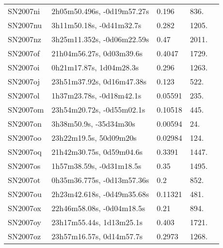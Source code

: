 \begin{longtable}{lllll}
         SN2007ni &     2h05m50.496s, -0d19m57.27s &    0.196 &           836. &    \citet{2011ApJ...740...92G} \\
         SN2007nu &       3h11m50.18s, -0d41m32.7s &    0.282 &          1205. &    \citet{2011ApJ...740...92G} \\
         SN2007nz &     3h25m11.352s, -0d06m22.59s &     0.47 &          2011. &    \citet{2007CBET.1109A...1B} \\
         SN2007of &       21h04m56.27s, 0d03m39.6s &   0.4047 &          1729. &    \citet{2011ApJ...740...92G} \\
         SN2007oi &        0h21m17.87s, 1d04m28.3s &    0.296 &          1263. &    \citet{2011ApJ...740...92G} \\
         SN2007oj &      23h51m37.92s, 0d16m47.38s &    0.123 &           522. &    \citet{2011ApJ...740...92G} \\
         SN2007ol &       1h37m23.78s, -0d18m42.1s &  0.05591 &           235. &    \citet{2001SDSSe.1...0000:} \\
         SN2007om &      23h54m20.72s, -0d55m02.1s &  0.10518 &           445. &    \citet{2003SDSS1.C...0000:} \\
         SN2007on &         3h38m50.9s, -35d34m30s &  0.00594 &            24. &    \citet{2016MNRAS.459.4450W} \\
         SN2007oo &         23h22m19.5s, 50d09m20s &  0.02984 &           124. &    \citet{1999ApJS..121..287H} \\
         SN2007oq &       21h42m30.75s, 0d59m04.6s &   0.3391 &          1447. &    \citet{2011ApJ...740...92G} \\
         SN2007os &       1h57m38.59s, -0d31m18.5s &     0.35 &          1495. &    \citet{2007CBET.1128A...1B} \\
         SN2007ot &     0h35m36.775s, -0d13m57.36s &      0.2 &           852. &    \citet{2011ApJ...740...92G} \\
         SN2007ou &     2h23m42.618s, -0d49m35.68s &  0.11321 &           481. &    \citet{2001SDSSe.1...0000:} \\
         SN2007ox &      22h46m58.08s, -0d04m18.5s &     0.21 &           894. &    \citet{2007CBET.1128A...1B} \\
         SN2007oy &       23h17m55.44s, 1d13m25.1s &    0.403 &          1721. &    \citet{2011ApJ...740...92G} \\
         SN2007oz &       23h57m16.57s, 0d14m57.7s &   0.2973 &          1268. &    \citet{2011ApJ...740...92G} \\

\end{longtable}
